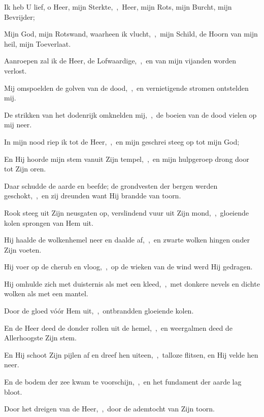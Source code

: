 \documentclass[12pt,twoside,a5paper]{article}
\begin{document}
\begin{halfparskip}

   Ik heb U lief, o Heer, mijn Sterkte,~\sep\ Heer, mijn Rots, mijn Burcht, mijn Bevrijder;


  Mijn God, mijn Rotswand, waarheen ik vlucht,~\sep\ mijn Schild, de Hoorn van mijn heil, mijn Toeverlaat.

  Aanroepen zal ik de Heer, de Lofwaardige,~\sep\ en van mijn vijanden worden verlost.

  Mij omspoelden de golven van de dood,~\sep\ en vernietigende stromen ontstelden mij.

  De strikken van het dodenrijk omknelden mij,~\sep\ de boeien van de dood vielen op mij neer.

  In mijn nood riep ik tot de Heer,~\sep\ en mijn geschrei steeg op tot mijn God;

  En Hij hoorde mijn stem vanuit Zijn tempel,~\sep\ en mijn hulpgeroep drong door tot Zijn oren.

  Daar schudde de aarde en beefde; de grondvesten der bergen werden geschokt,~\sep\ en zij dreunden want Hij brandde van toorn.

  Rook steeg uit Zijn neusgaten op, verslindend vuur uit Zijn mond,~\sep\ gloeiende kolen sprongen van Hem uit.

  Hij haalde de wolkenhemel neer en daalde af,~\sep\ en zwarte wolken hingen onder Zijn voeten.

  Hij voer op de cherub en vloog,~\sep\ op de wieken van de wind werd Hij gedragen.

  Hij omhulde zich met duisternis als met een kleed,~\sep\ met donkere nevels en dichte wolken als met een mantel.

  Door de gloed vóór Hem uit,~\sep\ ontbrandden gloeiende kolen.

  En de Heer deed de donder rollen uit de hemel,~\sep\ en weergalmen deed de Allerhoogste Zijn stem.

  En Hij schoot Zijn pijlen af en dreef hen uiteen,~\sep\ talloze flitsen, en Hij velde hen neer.

  En de bodem der zee kwam te voorschijn,~\sep\ en het fundament der aarde lag bloot.

  Door het dreigen van de Heer,~\sep\ door de ademtocht van Zijn toorn.


\end{halfparskip}
\end{document}
